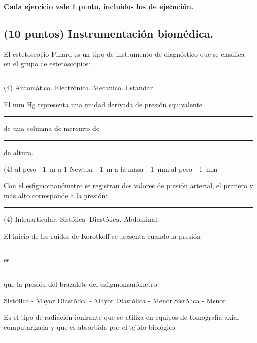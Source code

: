 \documentclass[12pt, letter]{exam}
\begin{document}

\setcounter{page}{3}

\newpage
\begin{center}
\textbf{Cada ejercicio vale 1 punto, incluidos los de ejecución.}
\end{center}

\begin{questions}

    \section{(10 puntos) Instrumentación biomédica.}

    \question El estetoscopio Pinard es un tipo de instrumento de diagnóstico que se clasifica en el grupo de estetoscopios: \rule{2cm}{0.1mm}
    \begin{tasks}(4)
        \task Automático.
        \task Electrónico.
        \task Mecánico.
        \task Estándar.
    \end{tasks}
    \question El mm Hg representa una unidad derivada de presión equivalente \rule{2cm}{0.1mm} de una columna de mercurio de \rule{2cm}{0.1mm} de altura.
    \begin{tasks}(4)
        \task al peso - \SI{1}{\meter}
        \task a 1 Newton - \SI{1}{\meter}
        \task a la masa - \SI{1}{\milli\meter}
        \task al peso - \SI{1}{\milli\meter}
    \end{tasks}
    \question Con el esfigmomanómetro se registran dos valores de presión arterial, el primero y más alto corresponde a la presión: \rule{2cm}{0.1mm}
    \begin{tasks}(4)
        \task Intraarticular.
        \task Sistólica.
        \task Diastólica.
        \task Abdominal.
    \end{tasks}
    \question El inicio de los ruidos de Korotkoff se presenta cuando la presión \rule{2cm}{0.1mm} es \rule{2cm}{0.1mm} que la presión del brazalete del esfigmomanómetro.
    \begin{multicols}{2}
    \begin{tasks}
        \task Sistólica - Mayor
        \task Diastólica - Mayor
        \task Diastólica - Menor
        \task Sistólica - Menor
    \end{tasks}
    \end{multicols}
    \question Es el tipo de radiación ionizante que se utiliza en equipos de tomografía axial computarizada y que es absorbida por el tejido biológico: \rule{2cm}{0.1mm}

\end{questions}
\end{document}
